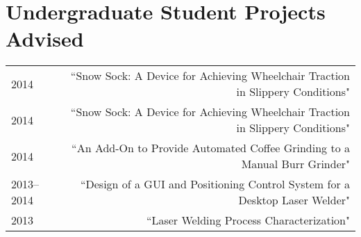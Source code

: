 
\section*{Undergraduate Student Projects Advised}
\begin{tabular}{L!{\VRule}R}
2014&``Snow Sock: A Device for Achieving Wheelchair Traction in Slippery Conditions"\\
2014&``Snow Sock: A Device for Achieving Wheelchair Traction in Slippery Conditions"\\
2014&``An Add-On to Provide Automated Coffee Grinding to a Manual Burr Grinder"\\
2013--2014&``Design of a GUI and Positioning Control System for a Desktop Laser Welder"\\
2013&``Laser Welding Process Characterization"\\
\end{tabular}